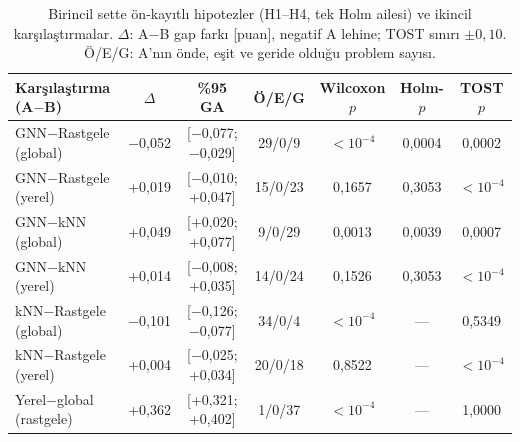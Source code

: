 \begin{table}[!htbp]
\centering\small\setlength{\tabcolsep}{3pt}
\caption{Birincil sette ön-kayıtlı hipotezler (H1--H4, tek Holm ailesi) ve ikincil karşılaştırmalar. $\Delta$: A$-$B gap farkı [puan], negatif A lehine; TOST sınırı $\pm0{,}10$. Ö/E/G: A'nın önde, eşit ve geride olduğu problem sayısı.}
\label{tab:v2-primary-tests}
\begin{tabular*}{\textwidth}{@{\extracolsep{\fill}}lcccccc}
\toprule
Karşılaştırma (A$-$B) & $\Delta$ & \%95 GA & Ö/E/G & Wilcoxon $p$ & Holm-$p$ & TOST $p$ \\
\midrule
GNN$-$Rastgele (global) & $-$0{,}052 & [$-$0{,}077; $-$0{,}029] & 29/0/9 & $<10^{-4}$ & 0{,}0004 & 0{,}0002 \\
GNN$-$Rastgele (yerel) & +0{,}019 & [$-$0{,}010; +0{,}047] & 15/0/23 & 0{,}1657 & 0{,}3053 & $<10^{-4}$ \\
GNN$-$kNN (global) & +0{,}049 & [+0{,}020; +0{,}077] & 9/0/29 & 0{,}0013 & 0{,}0039 & 0{,}0007 \\
GNN$-$kNN (yerel) & +0{,}014 & [$-$0{,}008; +0{,}035] & 14/0/24 & 0{,}1526 & 0{,}3053 & $<10^{-4}$ \\
\midrule
kNN$-$Rastgele (global) & $-$0{,}101 & [$-$0{,}126; $-$0{,}077] & 34/0/4 & $<10^{-4}$ & --- & 0{,}5349 \\
kNN$-$Rastgele (yerel) & +0{,}004 & [$-$0{,}025; +0{,}034] & 20/0/18 & 0{,}8522 & --- & $<10^{-4}$ \\
Yerel$-$global (rastgele) & +0{,}362 & [+0{,}321; +0{,}402] & 1/0/37 & $<10^{-4}$ & --- & 1{,}0000 \\
\bottomrule
\end{tabular*}
\end{table}

